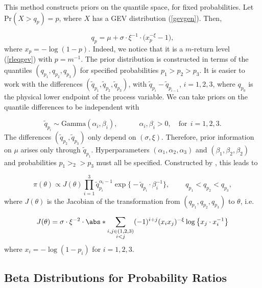This method constructs priors on the quantile space, for fixed probabilities. Let $\text{Pr}(X>q_p)=p$, where $X$ has a GEV distribution (\ref{gevgen}). Then,

\begin{equation*}
q_p=\mu + \sigma\cdot\xi^{-1}\cdot\big(x_p^{-\xi}-1\big),
\end{equation*}
where $x_p=-\log (1-p)$. Indeed, we notice that it is a $m$-return level (\ref{rleqgev}) with $p=m^{-1}$. The prior distribution is constructed in terms of the quantiles $(q_{p_1},q_{p_2}, q_{p_3})$ for specified probabilities $p_1>p_2>p_3$. It is easier to work with the differences $(\tilde{q}_{p_1},\tilde{q}_{p_2}, \tilde{q}_{p_3})$, with $\tilde{q}_{p_i}-\tilde{q}_{p_{i-1}}$, $i=1,2,3$, where $q_{p_0}$ is the physical lower endpoint of the process variable. We can take priors on the quantile differences to be independent with 

\begin{equation*}
\tilde{q}_{p_i}\sim \text{Gamma}(\alpha_i,\beta_i), \qquad\quad \alpha_i,\beta_i>0, \quad \text{for} \ \  i=1,2,3.
\end{equation*}
The differences $(\tilde{q}_{p_2},\tilde{q}_{p_3})$ only depend on $(\sigma,\xi)$. Therefore, prior information on $\mu$ arises only through $\tilde{q}_{p_1}$. Hyperparameters $(\alpha_1,\alpha_2,\alpha_3)$ and $(\beta_1,\beta_2,\beta_2)$ and probabilities $p_1>_2>p_3$ must all be specified. Constructed by \citet{coles_tawn_1996}, this leads to 

\begin{equation}
\pi(\theta)\propto J(\theta)\prod_{i=1}^3 \tilde{q}_{p_i}^{\alpha_i-1}\exp\big\{-\tilde{q}_{p_i}\cdot \beta_i^{-1}\big\}, \qquad \ q_{p_1}<q_{p_2}<q_{p_3},
\end{equation}
where $J(\theta)$ is the Jacobian of the transformation from $(q_{p_1},q_{p_2},q_{p_3})$ to $\theta$, i.e.

\begin{equation}
J(\theta)=\sigma\cdot\xi^{-2}\cdot\abs*{\sum_{\substack{i,j\in(1,2,3) \\ i<j}} (-1)^{i+j} (x_ix_j)^{-\xi} \log\big\{x_j\cdot x_i^{-1}\big\}}
\end{equation}
where $x_i=-\log(1-p_i)$ for $i=1,2,3$.

\subsection{Beta Distributions for Probability Ratios}


